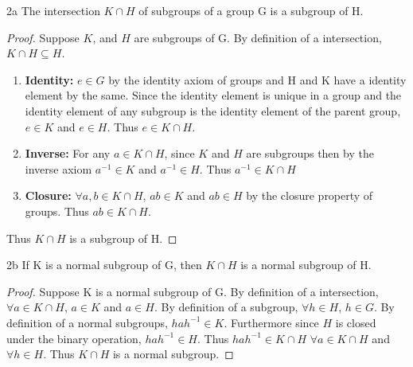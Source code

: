 \documentclass{article}
\begin{document}
\begin{claim}{2a}
    The intersection $K \cap H$ of subgroups of a group G is a subgroup of H.
\end{claim}
\begin{proof}
    Suppose $K$, and $H$ are subgroups of G. By definition of a intersection, $K \cap H \subseteq H$.

    \begin{enumerate}{}
        \item \textbf{Identity: } $e \in G$ by the identity axiom of groups and H and K have a identity element by the same. Since the identity element is unique in a group and the identity element of any subgroup is the identity element of the parent group, $e \in K$ and $e \in H$. Thus $e \in K \cap H$.
        \item \textbf{Inverse: } For any $a \in K \cap H$, since $K$ and $H$ are subgroups then by the inverse axiom $a^{-1} \in K$ and $a^{-1} \in H$. Thus $a^{-1} \in K \cap H$
        \item \textbf{Closure: } $\forall a, b \in K \cap H$, $ab \in K$ and $ab \in H$ by the closure property of groups. Thus $ab \in K \cap H$.
    \end{enumerate}

    Thus $K \cap H$ is a subgroup of H.
\end{proof}

\begin{claim}{2b}
    If K is a normal subgroup of G, then $K \cap H$ is a normal subgroup of H.
\end{claim}
\begin{proof}
    Suppose K is a normal subgroup of G. By definition of a intersection, $\forall a \in K \cap H$, $a \in K$ and $a \in H$. By definition of a subgroup, $\forall h \in H$, $h \in G$. By definition of a normal subgroups, $hah^{-1} \in K$. Furthermore since $H$ is closed under the binary operation, $hah^{-1} \in H$. Thus $hah^{-1} \in K \cap H$ $\forall a \in K \cap H$ and $\forall h \in H$. Thus $K \cap H$ is a normal subgroup.
\end{proof}

\bigskip
\end{document}
